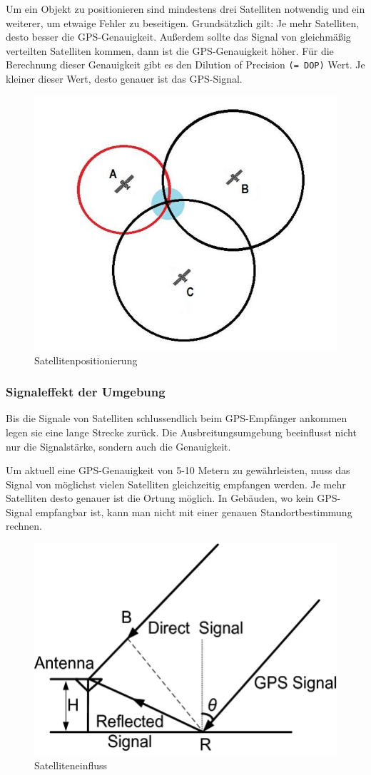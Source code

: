 Um ein Objekt zu positionieren sind mindestens drei Satelliten notwendig und ein weiterer, um etwaige Fehler zu beseitigen. Grundsätzlich gilt: Je mehr Satelliten, desto besser die GPS-Genauigkeit. Außerdem sollte das Signal von gleichmäßig verteilten Satelliten kommen, dann ist die GPS-Genauigkeit höher. Für die Berechnung dieser Genauigkeit gibt es den Dilution of Precision \texttt{(= DOP)} Wert.  Je kleiner dieser Wert, desto genauer ist das GPS-Signal.
\begin{figure}[H]
	\centering
	\includegraphics[width=0.7\linewidth]{images/Satellitenposition.jpg}
	\caption[Satellitenpositionierung]{Satellitenpositionierung}
	\label{fig:Satellitenposition}
\end{figure}

\newpage
\subsubsection{Signaleffekt der Umgebung}


Bis die Signale von Satelliten schlussendlich beim GPS-Empfänger ankommen legen sie eine lange Strecke zurück. Die Ausbreitungsumgebung beeinflusst nicht nur die Signalstärke, sondern auch die Genauigkeit.

Um aktuell eine GPS-Genauigkeit von 5-10 Metern zu gewährleisten, muss das Signal von möglichst vielen Satelliten gleichzeitig empfangen werden. Je mehr Satelliten desto genauer ist die Ortung möglich. In Gebäuden, wo kein GPS-Signal empfangbar ist, kann man nicht mit einer genauen Standortbestimmung rechnen. \parencite{GPSGenauigkeit}

\begin{figure}[H]
	\centering
	\includegraphics[width=0.7\linewidth]{images/Satelliteneinfluss.jpg}
	\caption[Satelliteneinfluss]{Satelliteneinfluss}
	\label{fig:Satelliteneinfluss}
\end{figure}

